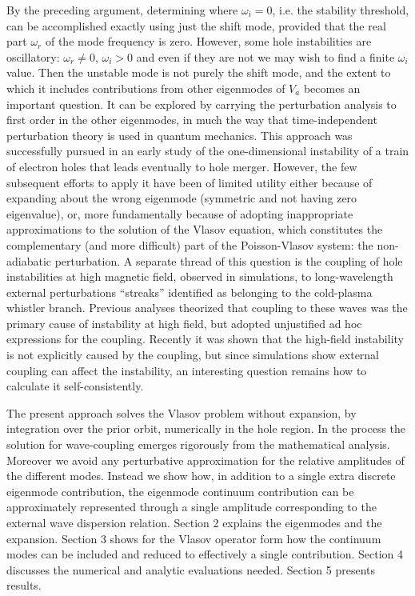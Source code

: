 \documentclass[12pt]{article}
\begin{document}
By the preceding argument, determining where $\omega_i=0$, i.e. the
stability threshold, can be accomplished exactly using just the shift
mode, provided that the real part $\omega_r$ of the mode frequency is
zero. However, some hole instabilities are oscillatory:
$\omega_r\not=0$, $\omega_i>0$ and even if they are not we may wish to
find a finite $\omega_i$ value. Then the unstable mode is not purely the
shift mode, and the extent to which it includes contributions from
other eigenmodes of $V_a$ becomes an important question. It can be
explored by carrying the perturbation analysis to first order in the
other eigenmodes, in much the way that time-independent perturbation
theory is used in quantum mechanics. This approach was successfully
pursued in an early study of the one-dimensional instability of a
train of electron holes that leads eventually to hole
merger\cite{Schwarzmeier1979}. However, the few subsequent efforts to
apply it\cite{Schamel1982,Schamel1987} have been of limited utility
either because of expanding about the wrong eigenmode (symmetric and
not having zero eigenvalue), or, more fundamentally because of
adopting inappropriate approximations to the solution of the Vlasov
equation\cite{Jovanovic2002}, which constitutes the complementary (and
more difficult) part of the Poisson-Vlasov system: the non-adiabatic
perturbation. A separate thread of this question is the coupling of
hole instabilities at high magnetic field, observed in
simulations\cite{Oppenheim1999,Oppenheim2001b,Lu2008}, to
long-wavelength external perturbations ``streaks'' identified as
belonging to the cold-plasma whistler branch. Previous
analyses\cite{Newman2001a,Vetoulis2001,Berthomier2002} theorized that
coupling to these waves was the primary cause of instability at high
field, but adopted unjustified ad hoc expressions for the
coupling. Recently it was shown that the high-field instability is not
explicitly caused by the coupling\cite{Hutchinson2019a}, but since
simulations show external coupling can affect the instability, an
interesting question remains how to calculate it self-consistently.


The present approach solves the Vlasov problem without expansion, by
integration over the prior orbit, numerically in the hole region.  In
the process the solution for wave-coupling emerges rigorously from the
mathematical analysis. Moreover we avoid any perturbative
approximation for the relative amplitudes of the different modes.
Instead we show how, in addition to a single extra discrete eigenmode
contribution, the eigenmode continuum contribution can be
approximately represented through a single amplitude corresponding to
the external wave dispersion relation.  Section 2 explains the
eigenmodes and the expansion. Section 3 shows for the Vlasov operator
form how the continuum modes can be included and reduced to
effectively a single contribution. Section 4 discusses the numerical
and analytic evaluations needed. Section 5 presents results.
\end{document}
